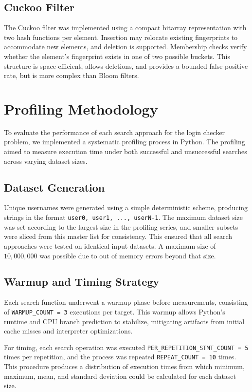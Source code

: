 \documentclass[acmsmall,screen, nonacm]{acmart}
\begin{document}
\subsection{Cuckoo Filter}
The Cuckoo filter was implemented using a compact bitarray representation with two hash functions per element.
Insertion may relocate existing fingerprints to accommodate new elements, and deletion is supported.
Membership checks verify whether the element's fingerprint exists in one of two possible buckets.
This structure is space-efficient, allows deletions, and provides a bounded false positive rate, but is more complex than Bloom filters.

\section{Profiling Methodology}

To evaluate the performance of each search approach for the login checker problem, we implemented a systematic profiling process in Python.
The profiling aimed to measure execution time under both successful and unsuccessful searches across varying dataset sizes.

\subsection{Dataset Generation}
Unique usernames were generated using a simple deterministic scheme, producing strings in the format \texttt{user0, user1, ..., userN-1}.
The maximum dataset size was set according to the largest size in the profiling series, and smaller subsets were sliced from this master list for consistency.
This ensured that all search approaches were tested on identical input datasets.
A maximum size of $10,000,000$ was possible due to out of memory errors beyond that size.

\subsection{Warmup and Timing Strategy}
Each search function underwent a warmup phase before measurements, consisting of \texttt{WARMUP\_COUNT = 3} executions per target.
This warmup allows Python's runtime and CPU branch prediction to stabilize, mitigating artifacts from initial cache misses and interpreter optimizations.

For timing, each search operation was executed \texttt{PER\_REPETITION\_STMT\_COUNT = 5} times per repetition, and the process was repeated \texttt{REPEAT\_COUNT = 10} times.
This procedure produces a distribution of execution times from which minimum, maximum, mean, and standard deviation could be calculated for each dataset size.
\end{document}

